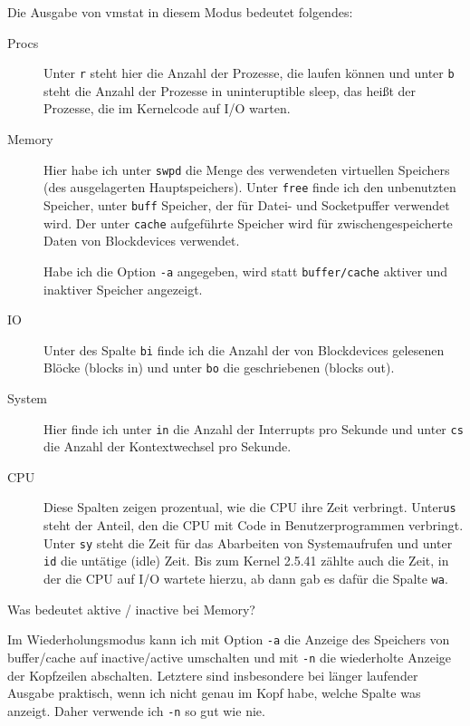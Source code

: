 \begin{normaltext}
  Die Ausgabe von vmstat in diesem Modus bedeutet folgendes:
  \begin{description}
    \item[Procs] Unter \verb?r? steht hier die Anzahl der Prozesse, die laufen
      können und unter \verb?b? steht die Anzahl der Prozesse in
      uninteruptible sleep, das heißt der Prozesse, die im Kernelcode auf I/O
      warten.
    \item[Memory] Hier habe ich unter \verb?swpd? die Menge des verwendeten
      virtuellen Speichers (des ausgelagerten Hauptspeichers). Unter
      \verb?free? finde ich den unbenutzten Speicher, unter \verb?buff?
      Speicher, der für Datei- und Socketpuffer verwendet wird. Der unter
      \verb?cache? aufgeführte Speicher wird für zwischengespeicherte Daten
      von Blockdevices verwendet.

      Habe ich die Option \verb?-a? angegeben, wird statt \verb?buffer/cache?
      aktiver und inaktiver Speicher angezeigt.
    \item[IO] Unter des Spalte \verb?bi? finde ich die Anzahl der von
      Blockdevices gelesenen Blöcke (blocks in) und unter \verb?bo? die
      geschriebenen (blocks out).
    \item[System] Hier finde ich unter \verb?in? die Anzahl der Interrupts pro
      Sekunde und unter \verb?cs? die Anzahl der Kontextwechsel pro Sekunde.
    \item[CPU] Diese Spalten zeigen prozentual, wie die CPU ihre Zeit
      verbringt. Unter\verb?us? steht der Anteil, den die CPU mit Code in
      Benutzerprogrammen verbringt. Unter \verb?sy? steht die Zeit für das
      Abarbeiten von Systemaufrufen und unter \verb?id? die untätige (idle)
      Zeit. Bis zum Kernel 2.5.41 zählte auch die Zeit, in der die CPU auf I/O
      wartete hierzu, ab dann gab es dafür die Spalte \verb?wa?.
  \end{description}
  \begin{notes}
  \item Was bedeutet aktive / inactive bei Memory?
  \end{notes}

  Im Wiederholungsmodus kann ich mit Option \verb?-a? die Anzeige des Speichers von
  buffer/cache auf inactive/active umschalten und mit \verb?-n? die
  wiederholte Anzeige der Kopfzeilen abschalten. Letztere sind insbesondere
  bei länger laufender Ausgabe praktisch, wenn ich nicht genau im Kopf habe,
  welche Spalte was anzeigt. Daher verwende ich \verb?-n? so gut wie nie.


\end{normaltext}
